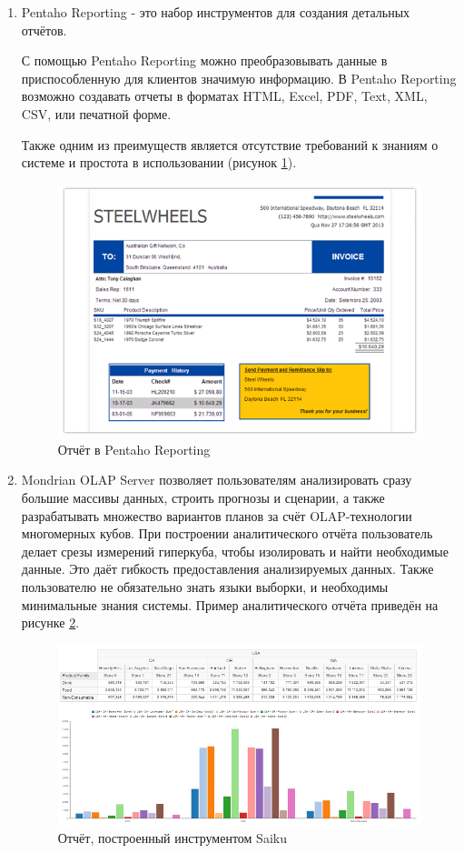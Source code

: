 \begin{enumerate}
	\item Pentaho Reporting - это набор инструментов для создания детальных отчётов. \cite{report} 
	
	С помощью Pentaho Reporting можно преобразовывать данные в  приспособленную для клиентов значимую информацию. В Pentaho Reporting возможно создавать отчеты в форматах HTML, Excel, PDF, Text, XML, CSV, или печатной форме. 
	
	Также одним из преимуществ является отсутствие требований к знаниям о системе и простота в использовании (рисунок \ref{fig:pentaho_rep}).
	
	\begin{figure}[htbp]
		\centering
		\includegraphics[width=.9\textwidth]{fig/chapter_1/pentaho_rep}
		\caption{Отчёт в Pentaho Reporting}
		\label{fig:pentaho_rep}
	\end{figure}

	\item Mondrian OLAP Server позволяет пользователям анализировать сразу большие массивы данных, строить прогнозы и сценарии, а также разрабатывать множество вариантов планов за счёт OLAP-технологии многомерных кубов. При построении аналитического отчёта пользователь делает срезы измерений гиперкуба, чтобы изолировать и найти необходимые данные. Это даёт гибкость предоставления анализируемых данных. Также пользователю не обязательно знать языки выборки, и необходимы минимальные знания системы. Пример аналитического отчёта приведён на рисунке \ref{fig:saiku}. 
	
	\begin{figure}[htbp]
		\centering
		\includegraphics[width=.9\textwidth]{fig/chapter_1/saiku}
		\caption{Отчёт, построенный инструментом Saiku}
		\label{fig:saiku}
	\end{figure}
\end{enumerate}

